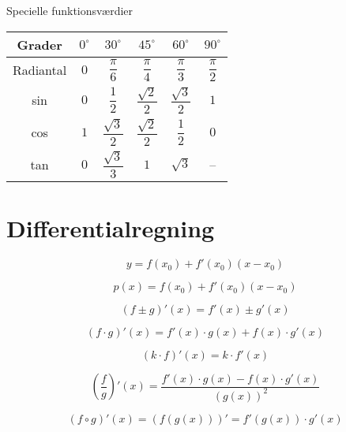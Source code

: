 \documentclass[11pt,a4paper,landscape,twocolumn,fleqn,leqno]{article}
\begin{document}
Specielle funktionsværdier

\begin{tabular}{c|c c c c c}
\hline
Grader       & $0^{\circ}$ & $30^{\circ}$ & $45^{\circ}$ & $60^{\circ}$ & $90^{\circ}$ \\
\hline
Radiantal    & $0$ & $\dfrac{\pi}{6}$ & $\dfrac{\pi}{4}$ & $\dfrac{\pi}{3}$ & $\dfrac{\pi}{2}$ \\
\hline
sin          & $0$ & $\dfrac{1}{2}$ & $\dfrac{\sqrt{2}}{2}$ & $\dfrac{\sqrt{3}}{2}$ & $1$ \\
\hline
cos          & $1$ & $\dfrac{\sqrt{3}}{2}$ & $\dfrac{\sqrt{2}}{2}$ & $\dfrac{1}{2}$ & $0$ \\
\hline
tan          & $0$ & $\dfrac{\sqrt{3}}{3}$ & $1$ & $\sqrt{3}$ & -- \\
\hline
\end{tabular}

\section{Differentialregning}

\begin{equation}
y = f(x_0) + f'(x_0)(x-x_0)
\end{equation}

\begin{equation}
p(x) = f(x_0) + f'(x_0)(x-x_0)
\end{equation}

\begin{equation}
\left(f \pm g\right)'(x) = f'(x) \pm g'(x)
\end{equation}

\begin{equation}
\left(f \cdot g\right)'(x) = f'(x) \cdot g(x) + f(x) \cdot g'(x)
\end{equation}

\begin{equation}
\left(k \cdot f\right)'(x) = k \cdot f'(x)
\end{equation}

\begin{equation}
\left(\frac{f}{g}\right)'(x) = \frac{f'(x) \cdot g(x) - f(x) \cdot g'(x)}{\left(g(x)\right)^2}
\end{equation}

\begin{equation}
\left(f \circ g\right)'(x) = \left(f\left(g(x)\right)\right)' = f'\left(g(x)\right) \cdot g'(x)
\end{equation}
\end{document}
